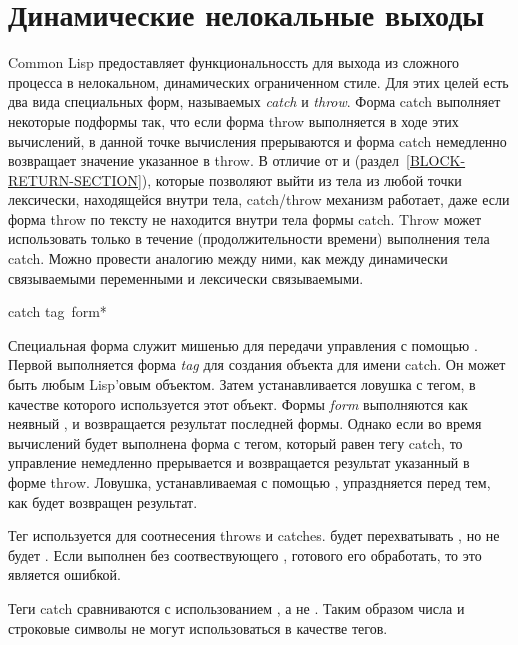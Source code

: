 \section{Динамические нелокальные выходы}
\label{CATCH-THROW-SECTION}

Common Lisp предоставляет функциональноссть для выхода из сложного процесса в
нелокальном, динамических ограниченном стиле. Для этих целей есть два вида
специальных форм, называемых \emph{catch} и \emph{throw}.
Форма catch выполняет некоторые подформы так, что если форма throw выполняется в
ходе этих вычислений, в данной точке вычисления прерываются и форма catch
немедленно возвращает значение указанное в throw. В отличие от  и
 (раздел~\ref{BLOCK-RETURN-SECTION}), которые позволяют выйти из
тела  из любой точки лексически, находящейся внутри тела, catch/throw
механизм работает, даже если форма throw по тексту не находится внутри тела
формы catch.
Throw может использовать только в течение (продолжительности времени) выполнения
тела catch. Можно провести аналогию между ними, как между динамически
связываемыми переменными и лексически связываемыми.

\begin{defspec}
catch tag {\,form}*

Специальная форма  служит мишенью для передачи управления с помощью
.
Первой выполняется форма \emph{tag} для создания объекта для имени catch.
Он может быть любым Lisp'овым объектом.
Затем устанавливается ловушка с тегом, в качестве которого используется этот
объект.
Формы \emph{form} выполняются как неявный ,
и возвращается результат последней формы.
Однако если во время вычислений будет выполнена форма  с тегом,
который равен  тегу catch, то управление немедленно прерывается и
возвращается результат указанный в форме throw.
Ловушка, устанавливаемая с помощью , упраздняется перед тем, как
будет возвращен результат.

Тег используется для соотнесения throws и catches.
 будет перехватывать ,
но не будет . Если  выполнен без
соотвествующего , готового его обработать, то это является ошибкой.

Теги catch сравниваются с использованием , а не .
Таким образом числа и строковые символы не могут использоваться в качестве
тегов.
\end{defspec}

